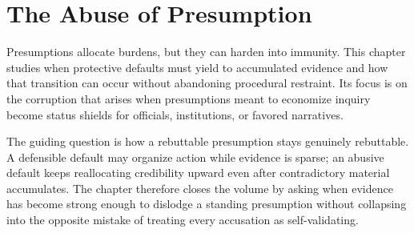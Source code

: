 
\chapter{The Abuse of Presumption}
\label{ch:ch096}

Presumptions allocate burdens, but they can harden into immunity. This chapter studies when protective defaults must yield to accumulated evidence and how that transition can occur without abandoning procedural restraint. Its focus is on the corruption that arises when presumptions meant to economize inquiry become status shields for officials, institutions, or favored narratives.

The guiding question is how a rebuttable presumption stays genuinely rebuttable. A defensible default may organize action while evidence is sparse; an abusive default keeps reallocating credibility upward even after contradictory material accumulates. The chapter therefore closes the volume by asking when evidence has become strong enough to dislodge a standing presumption without collapsing into the opposite mistake of treating every accusation as self-validating.
